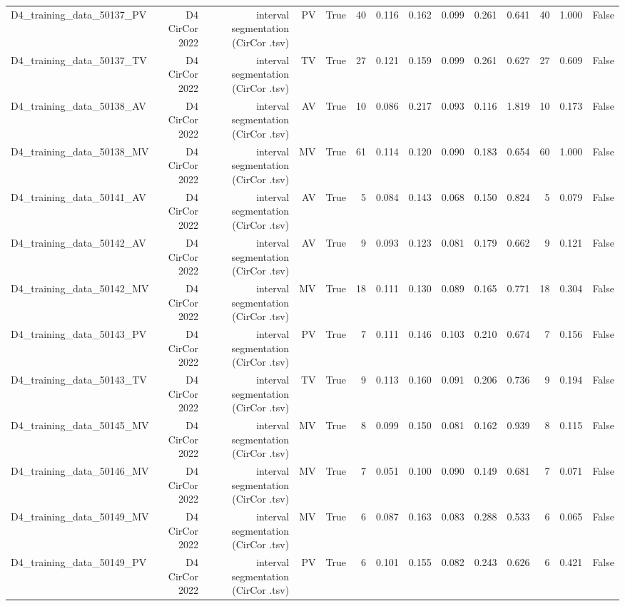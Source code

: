 \begin{table}[htbp]
\begin{tabular}{lrrrrrrrrrrrrr}
    D4\_training\_data\_50137\_PV & D4 CirCor 2022 & interval segmentation (CirCor .tsv) & PV & True & 40 & 0.116 & 0.162 & 0.099 & 0.261 & 0.641 & 40 & 1.000 & False \\
    D4\_training\_data\_50137\_TV & D4 CirCor 2022 & interval segmentation (CirCor .tsv) & TV & True & 27 & 0.121 & 0.159 & 0.099 & 0.261 & 0.627 & 27 & 0.609 & False \\
    D4\_training\_data\_50138\_AV & D4 CirCor 2022 & interval segmentation (CirCor .tsv) & AV & True & 10 & 0.086 & 0.217 & 0.093 & 0.116 & 1.819 & 10 & 0.173 & False \\
    D4\_training\_data\_50138\_MV & D4 CirCor 2022 & interval segmentation (CirCor .tsv) & MV & True & 61 & 0.114 & 0.120 & 0.090 & 0.183 & 0.654 & 60 & 1.000 & False \\
    D4\_training\_data\_50141\_AV & D4 CirCor 2022 & interval segmentation (CirCor .tsv) & AV & True & 5 & 0.084 & 0.143 & 0.068 & 0.150 & 0.824 & 5 & 0.079 & False \\
    D4\_training\_data\_50142\_AV & D4 CirCor 2022 & interval segmentation (CirCor .tsv) & AV & True & 9 & 0.093 & 0.123 & 0.081 & 0.179 & 0.662 & 9 & 0.121 & False \\
    D4\_training\_data\_50142\_MV & D4 CirCor 2022 & interval segmentation (CirCor .tsv) & MV & True & 18 & 0.111 & 0.130 & 0.089 & 0.165 & 0.771 & 18 & 0.304 & False \\
    D4\_training\_data\_50143\_PV & D4 CirCor 2022 & interval segmentation (CirCor .tsv) & PV & True & 7 & 0.111 & 0.146 & 0.103 & 0.210 & 0.674 & 7 & 0.156 & False \\
    D4\_training\_data\_50143\_TV & D4 CirCor 2022 & interval segmentation (CirCor .tsv) & TV & True & 9 & 0.113 & 0.160 & 0.091 & 0.206 & 0.736 & 9 & 0.194 & False \\
    D4\_training\_data\_50145\_MV & D4 CirCor 2022 & interval segmentation (CirCor .tsv) & MV & True & 8 & 0.099 & 0.150 & 0.081 & 0.162 & 0.939 & 8 & 0.115 & False \\
    D4\_training\_data\_50146\_MV & D4 CirCor 2022 & interval segmentation (CirCor .tsv) & MV & True & 7 & 0.051 & 0.100 & 0.090 & 0.149 & 0.681 & 7 & 0.071 & False \\
    D4\_training\_data\_50149\_MV & D4 CirCor 2022 & interval segmentation (CirCor .tsv) & MV & True & 6 & 0.087 & 0.163 & 0.083 & 0.288 & 0.533 & 6 & 0.065 & False \\
    D4\_training\_data\_50149\_PV & D4 CirCor 2022 & interval segmentation (CirCor .tsv) & PV & True & 6 & 0.101 & 0.155 & 0.082 & 0.243 & 0.626 & 6 & 0.421 & False \\

\end{tabular}
\end{table}

